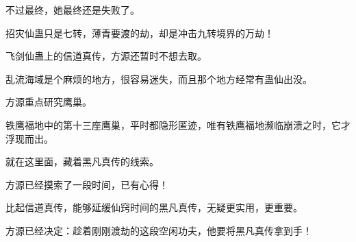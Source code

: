 \begin{this_body}
不过最终，她最终还是失败了。

招灾仙蛊只是七转，薄青要渡的劫，却是冲击九转境界的万劫！

飞剑仙蛊上的信道真传，方源还暂时不想去取。

乱流海域是个麻烦的地方，很容易迷失，而且那个地方经常有蛊仙出没。

方源重点研究鹰巢。

铁鹰福地中的第十三座鹰巢，平时都隐形匿迹，唯有铁鹰福地濒临崩溃之时，它才浮现而出。

就在这里面，藏着黑凡真传的线索。

方源已经摸索了一段时间，已有心得！

比起信道真传，能够延缓仙窍时间的黑凡真传，无疑更实用，更重要。

方源已经决定：趁着刚刚渡劫的这段空闲功夫，他要将黑凡真传拿到手！

\end{this_body}


